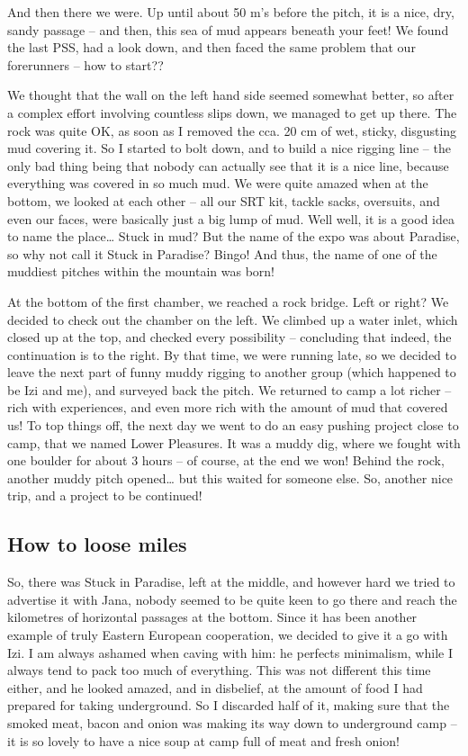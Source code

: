 And then there we were. Up until about 50 m's before the pitch, it is a
nice, dry, sandy passage -- and then, this sea of mud appears beneath
your feet! We found the last PSS, had a look down, and then faced the
same problem that our forerunners -- how to start??

We thought that the wall on the left hand side seemed somewhat better,
so after a complex effort involving countless slips down, we managed to
get up there. The rock was quite OK, as soon as I removed the cca. 20 cm
of wet, sticky, disgusting mud covering it. So I started to bolt down,
and to build a nice rigging line -- the only bad thing being that nobody
can actually see that it is a nice line, because everything was covered
in so much mud. We were quite amazed when at the bottom, we looked at
each other -- all our SRT kit, tackle sacks, oversuits, and even our
faces, were basically just a big lump of mud. Well well, it is a good
idea to name the place\ldots{} Stuck in mud? But the name of the expo
was about Paradise, so why not call it Stuck in Paradise? Bingo! And
thus, the name of one of the muddiest pitches within the mountain was
born!

At the bottom of the first chamber, we reached a rock bridge. Left or
right? We decided to check out the chamber on the left. We climbed up a
water inlet, which closed up at the top, and checked every possibility
-- concluding that indeed, the continuation is to the right. By that
time, we were running late, so we decided to leave the next part of
funny muddy rigging to another group (which happened to be Izi and me),
and surveyed back the pitch. We returned to camp a lot richer -- rich
with experiences, and even more rich with the amount of mud that covered
us! To top things off, the next day we went to do an easy pushing
project close to camp, that we named Lower Pleasures. It was a muddy
dig, where we fought with one boulder for about 3 hours -- of course, at
the end we won! Behind the rock, another muddy pitch opened\ldots{} but
this waited for someone else. So, another nice trip, and a project to be
continued!


\hypertarget{how-to-loose-miles}{%
\subsection{How to loose miles}\label{how-to-loose-miles}}

So, there was Stuck in Paradise, left at the middle, and however hard we
tried to advertise it with Jana, nobody seemed to be quite keen to go
there and reach the kilometres of horizontal passages at the bottom.
Since it has been another example of truly Eastern European cooperation,
we decided to give it a go with Izi. I am always ashamed when caving
with him: he perfects minimalism, while I always tend to pack too much
of everything. This was not different this time either, and he looked
amazed, and in disbelief, at the amount of food I had prepared for
taking underground. So I discarded half of it, making sure that the
smoked meat, bacon and onion was making its way down to underground camp
-- it is so lovely to have a nice soup at camp full of meat and fresh
onion!


